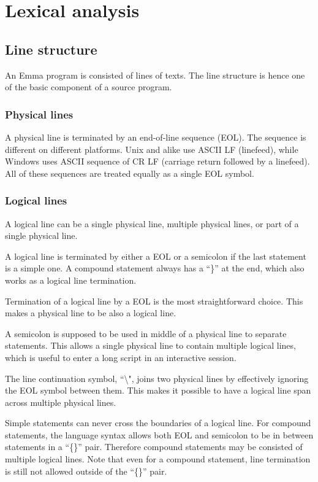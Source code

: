 \documentclass[10pt,a4paper]{article}
\begin{document}
\pagebreak

\section{Lexical analysis}
\subsection{Line structure}
An Emma program is consisted of lines of texts. The line structure is
hence one of the basic component of a source program.

\subsubsection{Physical lines}
A physical line is terminated by an end-of-line sequence (EOL). The
sequence is different on different platforms. Unix and alike use ASCII LF
(linefeed), while Windows uses ASCII sequence of CR LF (carriage return followed
by a linefeed). All of these sequences are treated equally as a single 
EOL symbol.

\subsubsection{Logical lines}
A logical line can be a single physical line, multiple physical lines, or
part of a single physical line.

A logical line is terminated by either a EOL or a semicolon if the last
statement is a simple one. A compound statement always has a ``\}'' at 
the end, which also works as a logical line termination.

Termination of a logical line by a EOL is the most straightforward choice. 
This makes a physical line to be also a logical line.

A semicolon is supposed to be used in middle of a physical line to separate 
statements. This allows a single physical line to contain multiple logical
lines, which is useful to enter a long script in an interactive session.

The line continuation symbol, ``\textbackslash", joins two physical lines
by effectively ignoring the EOL symbol between them.
This makes it possible to have a logical line span across multiple 
physical lines. 

Simple statements can never cross the boundaries of a logical line.
For compound statements, the language syntax allows both EOL and semicolon
to be in between statements in a ``\{\}'' pair. Therefore compound statements
may be consisted of multiple logical lines. Note that even for a compound 
statement, line termination is still not allowed outside of the 
``\{\}'' pair. 
\end{document}
